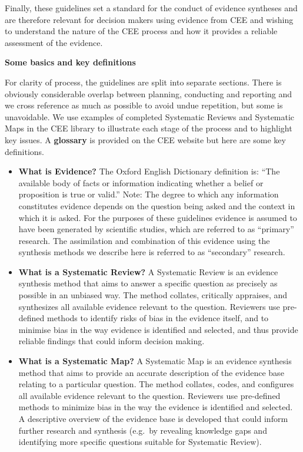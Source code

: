 \documentclass[
  letterpaper,
  DIV=11,
  numbers=noendperiod]{scrreprt}
\begin{document}
Finally, these guidelines set a standard for the conduct of evidence
syntheses and are therefore relevant for decision makers using evidence
from CEE and wishing to understand the nature of the CEE process and how
it provides a reliable assessment of the evidence.

\textbf{Some basics and key definitions}

For clarity of process, the guidelines are split into separate sections.
There is obviously considerable overlap between planning, conducting and
reporting and we cross reference as much as possible to avoid undue
repetition, but some is unavoidable. We use examples of completed
Systematic Reviews and Systematic Maps in the CEE library to illustrate
each stage of the process and to highlight key issues. A
\textbf{glossary} is provided on the CEE website but here are some key
definitions.

\begin{itemize}
\item
  \textbf{What is Evidence?} The Oxford English Dictionary definition
  is: ``The available body of facts or information indicating whether a
  belief or proposition is true or valid.'' Note: The degree to which
  any information constitutes evidence depends on the question being
  asked and the context in which it is asked. For the purposes of these
  guidelines evidence is assumed to have been generated by scientific
  studies, which are referred to as ``primary'' research. The
  assimilation and combination of this evidence using the synthesis
  methods we describe here is referred to as ``secondary'' research.
\item
  \textbf{What is a Systematic Review?} A Systematic Review is an
  evidence synthesis method that aims to answer a specific question as
  precisely as possible in an unbiased way. The method collates,
  critically appraises, and synthesizes all available evidence relevant
  to the question. Reviewers use pre-defined methods to identify risks
  of bias in the evidence itself, and to minimise bias in the way
  evidence is identified and selected, and thus provide reliable
  findings that could inform decision making.
\item
  \textbf{What is a Systematic Map?} A Systematic Map is an evidence
  synthesis method that aims to provide an accurate description of the
  evidence base relating to a particular question. The method collates,
  codes, and configures all available evidence relevant to the question.
  Reviewers use pre-defined methods to minimize bias in the way the
  evidence is identified and selected. A descriptive overview of the
  evidence base is developed that could inform further research and
  synthesis (e.g.~by revealing knowledge gaps and identifying more
  specific questions suitable for Systematic Review).
\end{itemize}
\end{document}
